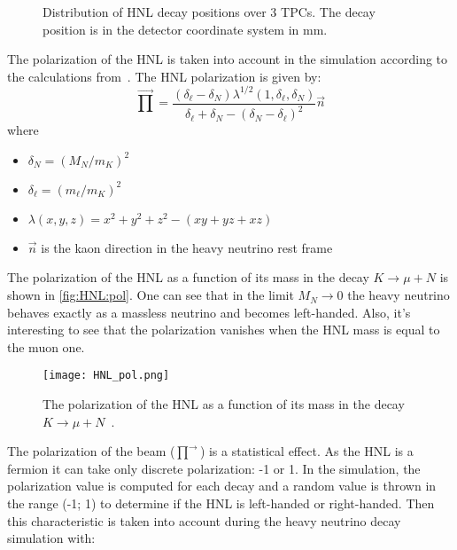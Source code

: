 \documentclass[../main.tex]{subfiles}
\begin{document}
\begin{figure}[!ht]
    \caption{Distribution of HNL decay positions over 3 TPCs. The decay position is in the detector coordinate system in mm.}
    \label{fig:HNL:decayPos}
\end{figure}

The polarization of the HNL is taken into account in the simulation according to the calculations from~\cite{Levy2018}. The HNL polarization is given by:
\begin{equation}
    \overrightarrow\prod=\frac{\left(\delta_\ell-\delta_{N}\right)\lambda^{1/2}\left(1,\delta_\ell, \delta_{N}\right)}{\delta_\ell+\delta_{N}-\left(\delta_{N}-\delta_\ell\right)^2}\overrightarrow{n}
\end{equation}
where
\begin{itemize}
    \item $\delta_{N}=\left(M_{N}/m_K\right)^2$
    \item $\delta_\ell=\left(m_\ell/m_K\right)^2$
    \item $\lambda\left(x, y, z\right)=x^2+y^2+z^2-\left(xy+yz+xz\right)$
    \item $\overrightarrow{n}$ is the kaon direction in the heavy neutrino rest frame
\end{itemize}

The polarization of the HNL as a function of its mass in the decay $K\to\mu+N$ is shown in \autoref{fig:HNL:pol}. One can see that in the limit $M_N\to0$ the heavy neutrino behaves exactly as a massless neutrino and becomes left-handed. Also, it's interesting to see that the polarization vanishes when the HNL mass is equal to the muon one.

\begin{figure}[!ht]
    \centering
    \texttt{[image: HNL\_pol.png]}
    \caption{The polarization of the HNL as a function of its mass in the decay $K\to\mu+N$~\cite{Levy2018}.}
    \label{fig:HNL:pol}
\end{figure}

The polarization of the beam ($\overrightarrow{\prod}$) is a statistical effect. As the HNL is a fermion it can take only discrete polarization: -1 or 1. In the simulation, the polarization value is computed for each decay and a random value is thrown in the range (-1; 1) to determine if the HNL is left-handed or right-handed. Then this characteristic is taken into account during the heavy neutrino decay simulation with:
\end{document}

